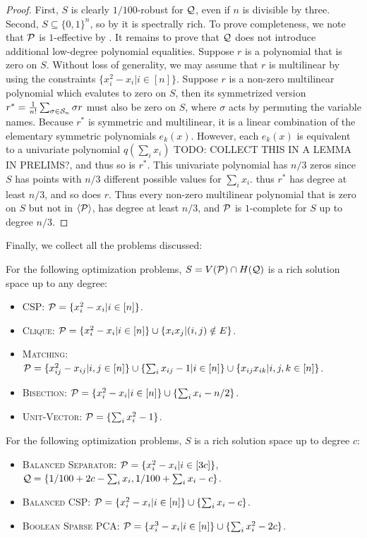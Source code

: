 \begin{proof}
First, $S$ is clearly $1/100$-robust for $\mathcal Q$, even if $n$ is divisible by three. Second, $S \subseteq \{0,1\}^n$, so by  it is spectrally rich. To prove completeness, we note that $\mathcal P$ is $1$-effective by . It remains to prove that $\mathcal Q$ does not introduce additional low-degree polynomial equalities. 
Suppose $r$ is a polynomial that is zero on $S$.  
Without loss of generality, we may assume that $r$ is multilinear by using the constraints $\{x_i^2 - x_i | i \in [n]\}$.
Suppose $r$ is a non-zero multilinear polynomial which evalutes to zero on $S$, then its symmetrized version $r^* = \frac{1}{n!}\sum_{\sigma \in \mathcal S_n} \sigma r$ must also be zero on $S$, where $\sigma$ acts by permuting the variable names. Because $r^*$ is symmetric and multilinear, it is a linear combination of the elementary symmetric polynomials $e_k(x)$. However, each $e_k(x)$ is equivalent to a univariate polynomial $q(\sum_i x_i)$ TODO: COLLECT THIS IN A LEMMA IN PRELIMS?, and thus so is $r^*$. This univariate polynomial has $n/3$ zeros since $S$ has points with $n/3$ different possible values for $\sum_i x_i$. thus $r^*$ has degree at least $n/3$, and so does $r$. Thus every non-zero multilinear polynomial that is zero on $S$ but not in $\langle \mathcal P\rangle$, has degree at least $n/3$, and $\mathcal P$ is $1$-complete for $S$ up to degree $n/3$.
\end{proof}
Finally, we collect all the problems discussed:
\begin{corollary}\label{cor:examples}
For the following optimization problems, $S = V(\mathcal P) \cap H(\mathcal Q)$ is a rich solution space up to any degree:
\begin{itemize}
\item \textsc{CSP}: $\mathcal P = \{x_i^2 - x_i | i \in [n]\}$. 
\item \textsc{Clique}: $\mathcal P = \{x_i^2 - x_i | i \in [n]\} \cup \{x_ix_j | (i,j) \notin E\}$.
\item \textsc{Matching}: $\mathcal P = \{x_{ij}^2 - x_{ij} | i,j \in [n]\} \cup \{\sum_i x_{ij} - 1 | i \in [n]\} \cup \{x_{ij}x_{ik} | i,j,k \in [n]\}$.
\item \textsc{Bisection}: $\mathcal P = \{x_i^2 - x_i | i \in [n]\} \cup \{\sum_i x_i - n/2\}$.
\item \textsc{Unit-Vector}: $\mathcal P = \{\sum_i x_i^2 - 1\}$.
\end{itemize}
For the following optimization problems, $S$ is a rich solution space up to degree $c$:
\begin{itemize}
\item \textsc{Balanced Separator}: $\mathcal P = \{x_i^2 - x_i | i \in [3c]\}$, $\mathcal Q = \{1/100 + 2c - \sum_i x_i, 1/100 + \sum_i x_i - c\}$.
\item \textsc{Balanced CSP}: $\mathcal P = \{x_i^2 - x_i | i \in [n]\} \cup \{\sum_i x_i - c\}$.
\item \textsc{Boolean Sparse PCA}: $\mathcal P = \{x_i^3-x_i | i \in [n]\} \cup \{\sum_i x_i^2 - 2c\}$.
\end{itemize}
\end{corollary}
